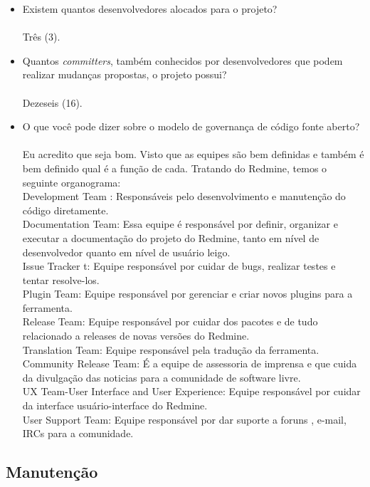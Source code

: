 \documentclass[12pt,a4paper]{article} %
\begin{document}
\begin{itemize}
\item Existem quantos desenvolvedores alocados para o projeto?\\
\\ Três (3).
\item Quantos \textit{committers}, tamb\'em conhecidos por desenvolvedores que podem realizar mudanças propostas, o projeto possui?\\
\\ Dezeseis (16).
\item O que você pode dizer sobre o modelo de governança de c\'odigo fonte aberto?\\
\\ Eu acredito que seja bom. Visto que as equipes são bem definidas e também é bem definido qual é a função de cada. Tratando do Redmine, temos o seguinte organograma:
\\Development Team : Responsáveis pelo desenvolvimento e manutenção do código diretamente.
\\Documentation Team: Essa equipe é responsável por definir, organizar e executar a documentação do projeto do Redmine, tanto em nível de desenvolvedor quanto em nível de usuário leigo.
\\Issue Tracker t: Equipe responsável por cuidar de bugs, realizar testes e tentar resolve-los.
\\Plugin Team: Equipe responsável por gerenciar e criar novos plugins para a ferramenta.
\\Release Team: Equipe responsável por cuidar dos pacotes e de tudo relacionado a releases de novas versões do Redmine.
\\Translation Team: Equipe responsável pela tradução da ferramenta.
\\Community Release Team: É a equipe de assessoria de imprensa e que cuida da divulgação das noticias para a comunidade de software livre.
\\UX Team-User Interface and User Experience: Equipe responsável por cuidar da interface usuário-interface do Redmine.
\\User Support Team: Equipe responsável por dar suporte a foruns , e-mail, IRCs para a comunidade.
\end{itemize}

\subsection{Manutenção}
\end{document}
